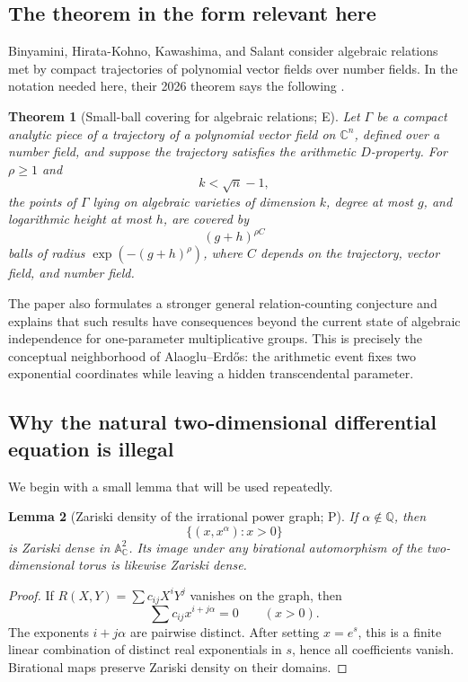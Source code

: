 \documentclass[10pt,oneside]{article}
\newtheorem{theorem}{Theorem}[section]
\newtheorem{lemma}[theorem]{Lemma}
\theoremstyle{definition}
\theoremstyle{remark}
\newcommand{\Q}{\mathbb Q}
\newcommand{\C}{\mathbb C}
\newcommand{\A}{\mathbb A}
\newcommand{\statusP}{\textsc{P}}
\newcommand{\statusE}{\textsc{E}}
\begin{document}
\subsection{The theorem in the form relevant here}
Binyamini, Hirata-Kohno, Kawashima, and Salant consider algebraic relations met by compact trajectories of polynomial vector fields over number fields.  In the notation needed here, their 2026 theorem says the following \cite{BHKKS2026}.

\begin{theorem}[Small-ball covering for algebraic relations; \statusE]
\label{thm:bhkks}
Let \(\Gamma\) be a compact analytic piece of a trajectory of a polynomial vector field on \(\C^n\), defined over a number field, and suppose the trajectory satisfies the arithmetic \(D\)-property.  For \(\rho\ge1\) and
\[
 k<\sqrt n-1,
\]
the points of \(\Gamma\) lying on algebraic varieties of dimension \(k\), degree at most \(g\), and logarithmic height at most \(h\), are covered by
\[
 (g+h)^{\rho C}
\]
balls of radius \(\exp(-(g+h)^\rho)\), where \(C\) depends on the trajectory, vector field, and number field.
\end{theorem}

The paper also formulates a stronger general relation-counting conjecture and explains that such results have consequences beyond the current state of algebraic independence for one-parameter multiplicative groups.  This is precisely the conceptual neighborhood of Alaoglu--Erd\H{o}s: the arithmetic event fixes two exponential coordinates while leaving a hidden transcendental parameter.

\subsection{Why the natural two-dimensional differential equation is illegal}
We begin with a small lemma that will be used repeatedly.

\begin{lemma}[Zariski density of the irrational power graph; \statusP]
\label{lem:zariski-power}
If \(\alpha\notin\Q\), then
\[
 \{(x,x^\alpha):x>0\}
\]
is Zariski dense in \(\A^2_\C\).  Its image under any birational automorphism of the two-dimensional torus is likewise Zariski dense.
\end{lemma}

\begin{proof}
If \(R(X,Y)=\sum c_{ij}X^iY^j\) vanishes on the graph, then
\[
 \sum c_{ij}x^{i+j\alpha}=0\qquad(x>0).
\]
The exponents \(i+j\alpha\) are pairwise distinct.  After setting \(x=e^s\), this is a finite linear combination of distinct real exponentials in \(s\), hence all coefficients vanish.  Birational maps preserve Zariski density on their domains.
\end{proof}
\end{document}
